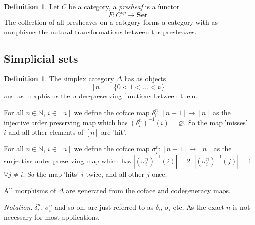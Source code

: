 \documentclass[12pt]{article}
\theoremstyle{definition}
\newtheorem{definition}[theorem]{Definition}
\newcommand{\N}{\mathbb{N}}
\newcommand{\1}{\mathbbm{1}}
\newcommand{\Set}{\mathbf{Set}}
\begin{document}
\begin{definition}
    Let $C$ be a category, a \emph{presheaf} is a functor \[
        F: C^{op}\to \Set
    \]
    The collection of all presheaves on a category forms a category with as morphisms the natural transformations between the presheaves.
\end{definition}

\subsection{Simplicial sets}
\begin{definition}
    The simplex category $\Delta$ has as objects
    \[
        [n] = \{0 < 1 < \dots < n\}
    \]
    and as morphisms the order-preserving functions between them.

    For all $n\in\N$, $i\in [n]$ we define the coface map $\delta^n_i: [n-1]\to [n]$ as the injective order preserving map which has $(\delta^n_i)^{-1}(i) = \varnothing$. So the map 'misses' $i$ and all other elements of $[n]$ are 'hit'.

    For all $n\in\N$, $i\in [n]$ we define the coface map $\sigma^n_i: [n-1]\to [n]$ as the surjective order preserving map which has $|(\sigma^n_i)^{-1}(i)| = 2$, $|(\sigma^n_i)^{-1}(j)| = 1$ $\forall j\neq i$. So the map 'hits' $i$ twice, and all other $j$ once.

    All morphisms of $\Delta$ are generated from the coface and codegeneracy maps.
\end{definition}

\textit{Notation: } $\delta_i^n$, $\sigma_i^n$ and so on, are just referred to as $\delta_i$, $\sigma_i$ etc. As the exact $n$ is not necessary for most applications. 
\end{document}
